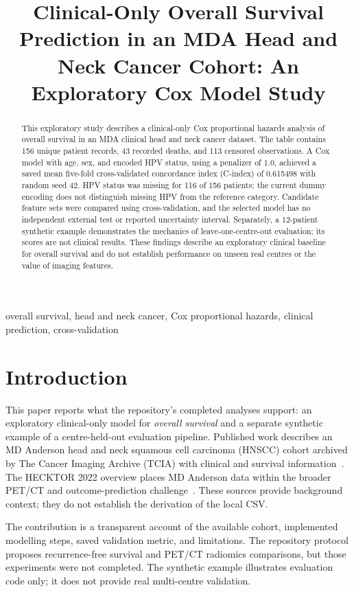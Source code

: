\documentclass[conference]{IEEEtran}
\title{Clinical-Only Overall Survival Prediction in an MDA Head and Neck Cancer Cohort: An Exploratory Cox Model Study}
\author{\IEEEauthorblockN{Tharuniya Anpalakan}
\IEEEauthorblockA{Department of Applied Sciences\\
Northumbria University\\
Newcastle upon Tyne, United Kingdom\\
\texttt{w25070895@northumbria.ac.lk}}}
\begin{document}
\maketitle

\begin{abstract}This exploratory study describes a clinical-only Cox proportional hazards analysis of overall survival in an MDA clinical head and neck cancer dataset. The table contains 156 unique patient records, 43 recorded deaths, and 113 censored observations. A Cox model with age, sex, and encoded HPV status, using a penalizer of 1.0, achieved a saved mean five-fold cross-validated concordance index (C-index) of 0.615498 with random seed 42. HPV status was missing for 116 of 156 patients; the current dummy encoding does not distinguish missing HPV from the reference category. Candidate feature sets were compared using cross-validation, and the selected model has no independent external test or reported uncertainty interval. Separately, a 12-patient synthetic example demonstrates the mechanics of leave-one-centre-out evaluation; its scores are not clinical results. These findings describe an exploratory clinical baseline for overall survival and do not establish performance on unseen real centres or the value of imaging features.
\end{abstract}

\begin{IEEEkeywords}
overall survival, head and neck cancer, Cox proportional hazards, clinical prediction, cross-validation
\end{IEEEkeywords}

\section{Introduction}
This paper reports what the repository's completed analyses support: an exploratory clinical-only model for \emph{overall survival} and a separate synthetic example of a centre-held-out evaluation pipeline. Published work describes an MD Anderson head and neck squamous cell carcinoma (HNSCC) cohort archived by The Cancer Imaging Archive (TCIA) with clinical and survival information~\cite{grossberg2018}. The HECKTOR 2022 overview places MD Anderson data within the broader PET/CT and outcome-prediction challenge~\cite{andrearczyk2023hecktor}. These sources provide background context; they do not establish the derivation of the local CSV.

The contribution is a transparent account of the available cohort, implemented modelling steps, saved validation metric, and limitations. The repository protocol proposes recurrence-free survival and PET/CT radiomics comparisons, but those experiments were not completed. The synthetic example illustrates evaluation code only; it does not provide real multi-centre validation.
\end{document}
